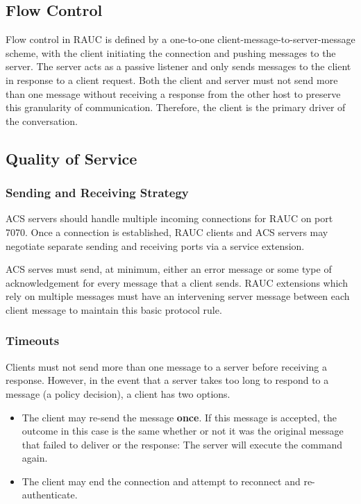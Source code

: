 \label{sec:ct}

\subsection{Flow Control}
\label{sec:pdus:flow}
Flow control in RAUC is defined by a one-to-one client-message-to-server-message scheme, with the client initiating the connection and pushing messages to the server. The server acts as a passive listener and only sends messages to the client in response to a client request. Both the client and server must not send more than one message without receiving a response from the other host to preserve this granularity of communication. Therefore, the client is the primary driver of the conversation.

\subsection{Quality of Service}
\subsubsection{Sending and Receiving Strategy}
ACS servers should handle multiple incoming connections for RAUC on port 7070. Once a connection is established, RAUC clients and ACS servers may negotiate separate sending and receiving ports via a service extension.

ACS serves must send, at minimum, either an error message or some type of acknowledgement for every message that a client sends. RAUC extensions which rely on multiple messages must have an intervening server message between each client message to maintain this basic protocol rule. 

\subsubsection{Timeouts}
Clients must not send more than one message to a server before receiving a response. However, in the event that a server takes too long to respond to a message (a policy decision), a client has two options.
\begin{itemize}
\item{The client may re-send the message \textbf{once}. If this message is accepted, the outcome in this case is the same whether or not it was the original message that failed to deliver or the response: The server will execute the command again.}
\item{The client may end the connection and attempt to reconnect and re-authenticate.}
\end{itemize}

